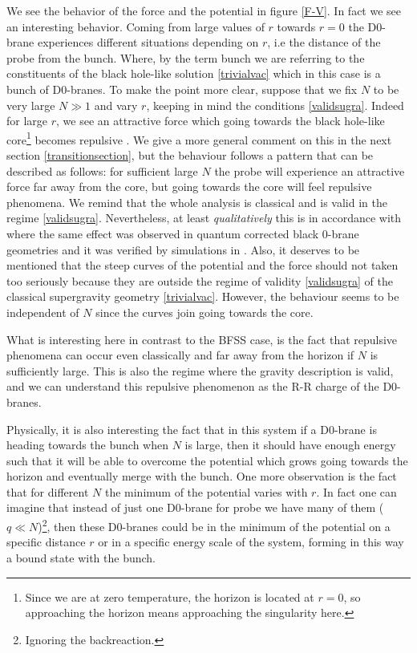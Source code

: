 \documentclass[11pt,english]{article}
\numberwithin{equation}{section}
\begin{document}
We see the behavior of the force and the potential in figure \ref{F-V}. In fact we see an interesting behavior. Coming from large values of $r$ towards $r=0$ the D0-brane experiences different situations depending on $r$, i.e  the distance of the probe from the bunch. Where, by the term bunch we are referring to the constituents of the black hole-like solution \eqref{trivialvac} which in this case is a bunch of D0-branes. To make the point more clear, suppose that we fix $N$ to be very large $N\gg1$ and vary $r$, keeping in mind the conditions \eqref{validsugra}. Indeed for large $r$, we see an attractive force which going towards the black hole-like core\footnote{Since we are at zero temperature, the horizon is located at $r=0$, so approaching the horizon means approaching the singularity here.} becomes repulsive . We give a more general comment on this in the next section \ref{transitionsection}, but the behaviour follows a pattern that can be described as follows: for sufficient large $N$ the probe will experience an attractive force far away from the core, but going towards the core will feel repulsive phenomena. We remind that the whole analysis is classical and is valid in the regime \eqref{validsugra}.  Nevertheless, at least \textit{qualitatively} this is in accordance with \cite{Hyakutake2014} where the same effect was observed in quantum corrected black 0-brane geometries and it was verified by simulations in \cite{Masanori2017}. Also, it deserves to be mentioned that  the steep curves of the potential and the force should not taken too seriously because they are outside the regime of validity \eqref{validsugra} of the classical supergravity geometry \eqref{trivialvac}. However, the behaviour seems to be independent of $N$ since the curves join going towards the core.

What is interesting here  in contrast to the BFSS case, is the fact that repulsive phenomena can occur even classically and far away from the horizon if $N$ is sufficiently large. This is also the regime where the gravity description is valid, and we can understand this repulsive phenomenon as the R-R charge of the D0-branes. 

Physically, it is also interesting the fact that in this system if a D0-brane is heading towards the bunch when $N$ is large, then it should have enough energy such that it will be able to overcome the potential which grows going towards the horizon and eventually merge with the bunch. One more observation is the fact that for different $N$ the minimum of the potential varies with $r$. In fact one can imagine that instead of just one D0-brane for probe we have many of them ($q\ll N$)\footnote{Ignoring the backreaction.}, then  these D0-branes could be in the minimum of the potential  on a specific distance $r$ or in a specific energy scale of the system, forming in this way a bound state with the bunch. 
\end{document}
